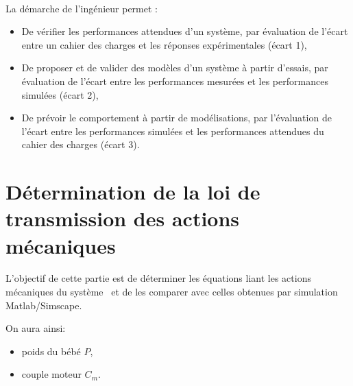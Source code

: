 

 \\

\graphicspath{{../../../img/}}
\begin{center}
\def\svgwidth{\columnwidth}

\end{center}

La démarche de l’ingénieur permet :
\begin{itemize}
 \item De vérifier les performances attendues d’un système, par évaluation de l’écart entre un cahier des charges et les réponses expérimentales (écart 1),
 \item De proposer et de valider des modèles d’un système à partir d’essais, par évaluation de l’écart entre les performances mesurées et les performances simulées (écart 2),
 \item De prévoir le comportement à partir de modélisations, par l’évaluation de l’écart entre les performances simulées et les performances attendues du cahier des charges (écart 3).
\end{itemize}


\newpage

\section{Détermination de la loi de transmission des actions mécaniques}

L'objectif de cette partie est de déterminer les équations liant les actions mécaniques du système \systemes\ et de les comparer avec celles obtenues par simulation Matlab/Simscape.

On aura ainsi:
\begin{itemize}
 \item poids du bébé $P$,
 \item couple moteur $C_m$.
\end{itemize}

